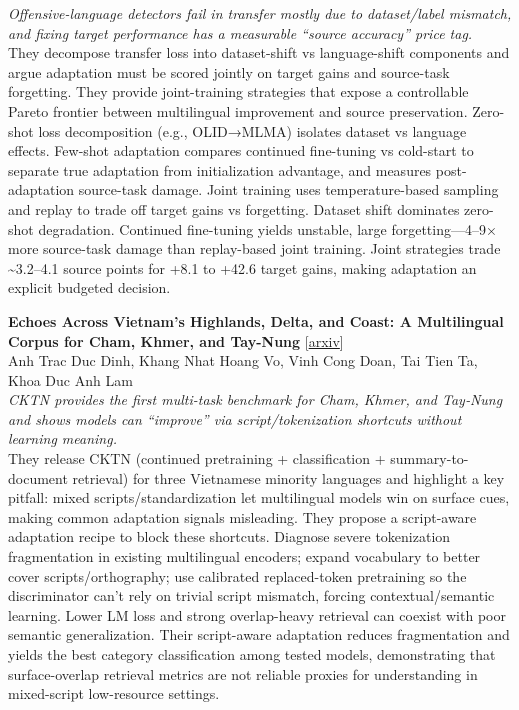 \documentclass[12pt,letterpaper]{article}
\begin{document}
{\small\textit{Offensive-language detectors fail in transfer mostly due to dataset/label mismatch, and fixing target performance has a measurable ``source accuracy'' price tag.}}\\[1pt]
{\footnotesize They decompose transfer loss into dataset-shift vs language-shift components and argue adaptation must be scored jointly on target gains and source-task forgetting. They provide joint-training strategies that expose a controllable Pareto frontier between multilingual improvement and source preservation. Zero-shot loss decomposition (e.g., OLID→MLMA) isolates dataset vs language effects. Few-shot adaptation compares continued fine-tuning vs cold-start to separate true adaptation from initialization advantage, and measures post-adaptation source-task damage. Joint training uses temperature-based sampling and replay to trade off target gains vs forgetting. Dataset shift dominates zero-shot degradation. Continued fine-tuning yields unstable, large forgetting---4--9× more source-task damage than replay-based joint training. Joint strategies trade \textasciitilde{}3.2--4.1 source points for +8.1 to +42.6 target gains, making adaptation an explicit budgeted decision.}

\medskip

{\small\textbf{Echoes Across Vietnam's Highlands, Delta, and Coast: A Multilingual Corpus for Cham, Khmer, and Tay-Nung}} {\scriptsize[\href{https://arxiv.org/abs/2607.08362}{arxiv}]}\\
{\scriptsize Anh Trac Duc Dinh, Khang Nhat Hoang Vo, Vinh Cong Doan, Tai Tien Ta, Khoa Duc Anh Lam}\\

{\small\textit{CKTN provides the first multi-task benchmark for Cham, Khmer, and Tay‑Nung and shows models can ``improve'' via script/tokenization shortcuts without learning meaning.}}\\[1pt]
{\footnotesize They release CKTN (continued pretraining + classification + summary-to-document retrieval) for three Vietnamese minority languages and highlight a key pitfall: mixed scripts/standardization let multilingual models win on surface cues, making common adaptation signals misleading. They propose a script-aware adaptation recipe to block these shortcuts. Diagnose severe tokenization fragmentation in existing multilingual encoders; expand vocabulary to better cover scripts/orthography; use calibrated replaced-token pretraining so the discriminator can't rely on trivial script mismatch, forcing contextual/semantic learning. Lower LM loss and strong overlap-heavy retrieval can coexist with poor semantic generalization. Their script-aware adaptation reduces fragmentation and yields the best category classification among tested models, demonstrating that surface-overlap retrieval metrics are not reliable proxies for understanding in mixed-script low-resource settings.}
\end{document}
